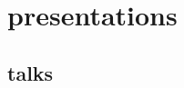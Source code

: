 \documentclass[]{friggeri-cv}
\begin{document}


\section{presentations}


\subsection{talks}
\end{document}
